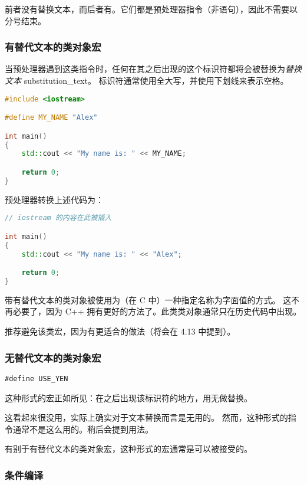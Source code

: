 \documentclass[../../LearnCpp.tex]{subfiles}
\begin{document}
前者没有替换文本，而后者有。它们都是预处理器指令（非语句），因此不需要以分号结束。

\subsubsection*{有替代文本的类对象宏}

当预处理器遇到这类指令时，任何在其之后出现的这个标识符都将会被替换为\textit{替换文本} substitution\_text。
标识符通常使用全大写，并使用下划线来表示空格。

\begin{lstlisting}[language=C++]
#include <iostream>

#define MY_NAME "Alex"

int main()
{
    std::cout << "My name is: " << MY_NAME;

    return 0;
}
\end{lstlisting}

预处理器转换上述代码为：

\begin{lstlisting}[language=C++]
// iostream 的内容在此被插入

int main()
{
    std::cout << "My name is: " << "Alex";

    return 0;
}
\end{lstlisting}

带有替代文本的类对象被使用为（在 C 中）一种指定名称为字面值的方式。
这不再必要了，因为 C++ 拥有更好的方法了。此类类对象通常只在历史代码中出现。

推荐避免该类宏，因为有更适合的做法（将会在 4.13 中提到）。

\subsubsection*{无替代文本的类对象宏}

\begin{lstlisting}
#define USE_YEN
\end{lstlisting}

这种形式的宏正如所见：在之后出现该标识符的地方，用无做替换。

这看起来很没用，实际上确实对于文本替换而言是无用的。
然而，这种形式的指令通常不是这么用的。稍后会提到用法。

有别于有替代文本的类对象宏，这种形式的宏通常是可以被接受的。

\subsubsection*{条件编译}
\end{document}
